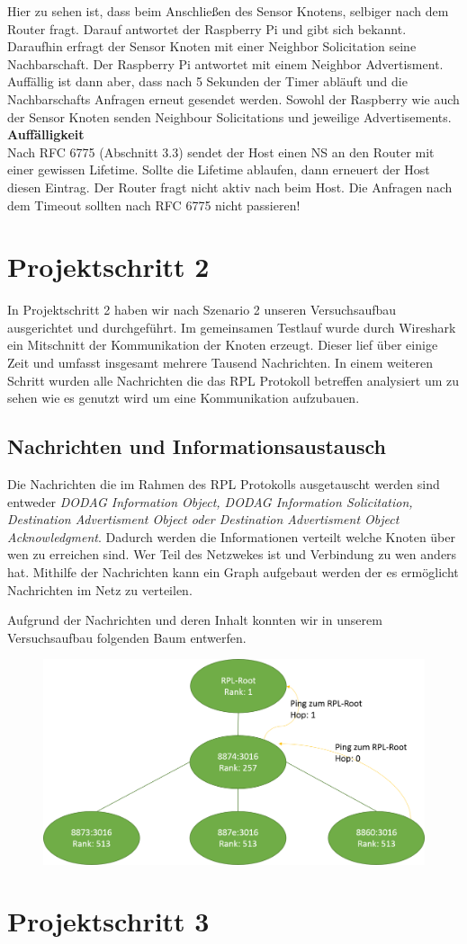 \documentclass[]{scrartcl}
\begin{document}
Hier zu sehen ist, dass beim Anschließen des Sensor Knotens, selbiger nach dem Router fragt. Darauf antwortet der Raspberry Pi und gibt sich bekannt. Daraufhin erfragt der Sensor Knoten mit einer Neighbor Solicitation seine Nachbarschaft. Der Raspberry Pi antwortet mit einem Neighbor Advertisment. Auffällig ist dann aber, dass nach 5 Sekunden der Timer abläuft und die Nachbarschafts Anfragen erneut gesendet werden. Sowohl der Raspberry wie auch der Sensor Knoten senden Neighbour Solicitations und jeweilige Advertisements.\\

\textbf{Auffälligkeit}\\
Nach RFC 6775 (Abschnitt 3.3) sendet der Host einen NS an den Router mit einer gewissen Lifetime. Sollte die Lifetime ablaufen, dann erneuert der Host diesen Eintrag. Der Router fragt nicht aktiv nach beim Host. Die Anfragen nach dem Timeout sollten nach RFC 6775 nicht passieren!


\section{Projektschritt 2}
In Projektschritt 2 haben wir nach Szenario 2 unseren Versuchsaufbau ausgerichtet und durchgeführt. Im gemeinsamen Testlauf wurde durch Wireshark ein Mitschnitt der Kommunikation der Knoten erzeugt. Dieser lief über einige Zeit und umfasst insgesamt mehrere Tausend Nachrichten. In einem weiteren Schritt wurden alle Nachrichten die das RPL Protokoll betreffen analysiert um zu sehen wie es genutzt wird um eine Kommunikation aufzubauen. 

\subsection{Nachrichten und Informationsaustausch}
Die Nachrichten die im Rahmen des RPL Protokolls ausgetauscht werden sind entweder \textit{DODAG Information Object, DODAG Information Solicitation, Destination Advertisment Object oder Destination Advertisment Object Acknowledgment}. Dadurch werden die Informationen verteilt welche Knoten über wen zu erreichen sind. Wer Teil des Netzwekes ist und Verbindung zu wen anders hat. Mithilfe der Nachrichten kann ein Graph aufgebaut werden der es ermöglicht Nachrichten im Netz zu verteilen. 

Aufgrund der Nachrichten und deren Inhalt konnten wir in unserem Versuchsaufbau folgenden Baum entwerfen.
\begin{figure}[H]
	\centering
	\includegraphics[width=1\linewidth]{RPL_Baum.png}
	\label{fig:RPL_Baum}
\end{figure}
\section{Projektschritt 3}
\end{document}
